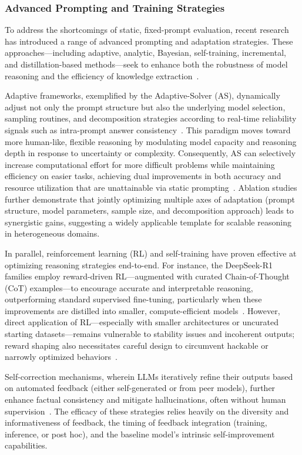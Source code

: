 \documentclass[sigconf]{acmart}
\begin{document}
\subsubsection{Advanced Prompting and Training Strategies}

To address the shortcomings of static, fixed-prompt evaluation, recent research has introduced a range of advanced prompting and adaptation strategies. These approaches---including adaptive, analytic, Bayesian, self-training, incremental, and distillation-based methods---seek to enhance both the robustness of model reasoning and the efficiency of knowledge extraction~\cite{ref1,ref4,ref6,ref49,ref56,ref57,ref68,ref86,ref103}.

Adaptive frameworks, exemplified by the Adaptive-Solver (AS), dynamically adjust not only the prompt structure but also the underlying model selection, sampling routines, and decomposition strategies according to real-time reliability signals such as intra-prompt answer consistency~\cite{ref4,ref57}. This paradigm moves toward more human-like, flexible reasoning by modulating model capacity and reasoning depth in response to uncertainty or complexity. Consequently, AS can selectively increase computational effort for more difficult problems while maintaining efficiency on easier tasks, achieving dual improvements in both accuracy and resource utilization that are unattainable via static prompting~\cite{ref4,ref57}. Ablation studies further demonstrate that jointly optimizing multiple axes of adaptation (prompt structure, model parameters, sample size, and decomposition approach) leads to synergistic gains, suggesting a widely applicable template for scalable reasoning in heterogeneous domains.

In parallel, reinforcement learning (RL) and self-training have proven effective at optimizing reasoning strategies end-to-end. For instance, the DeepSeek-R1 families employ reward-driven RL---augmented with curated Chain-of-Thought (CoT) examples---to encourage accurate and interpretable reasoning, outperforming standard supervised fine-tuning, particularly when these improvements are distilled into smaller, compute-efficient models~\cite{ref56,ref57,ref103}. However, direct application of RL---especially with smaller architectures or uncurated starting datasets---remains vulnerable to stability issues and incoherent outputs; reward shaping also necessitates careful design to circumvent hackable or narrowly optimized behaviors~\cite{ref56,ref57}.

Self-correction mechanisms, wherein LLMs iteratively refine their outputs based on automated feedback (either self-generated or from peer models), further enhance factual consistency and mitigate hallucinations, often without human supervision~\cite{ref68}. The efficacy of these strategies relies heavily on the diversity and informativeness of feedback, the timing of feedback integration (training, inference, or post hoc), and the baseline model's intrinsic self-improvement capabilities.
\end{document}
